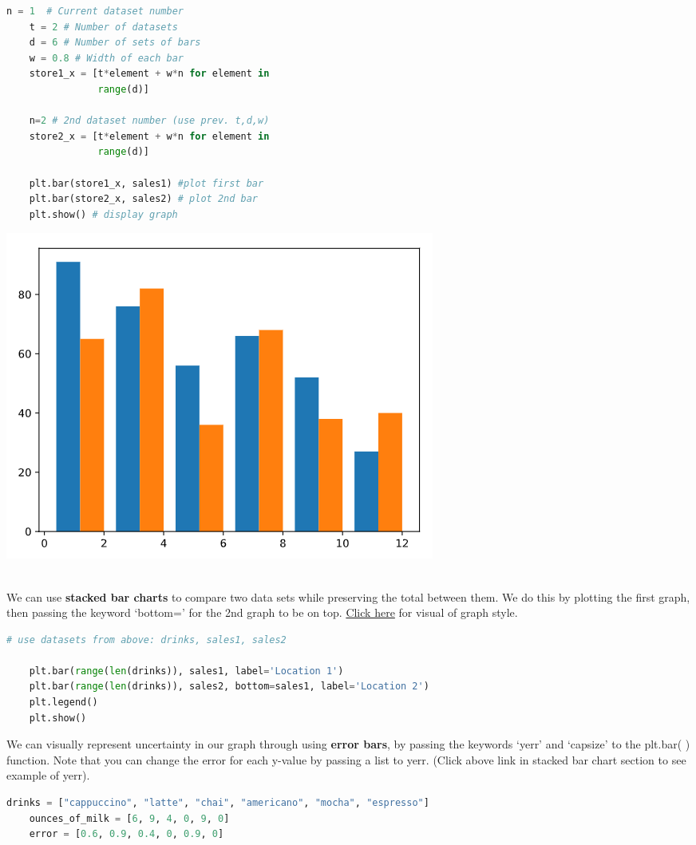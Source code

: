 \documentclass[11pt, a4paper]{article}
\begin{document}
\begin{spacing}{1.1}
\begin{minipage}[c]{9.2cm}
\begin{lstlisting}[language=Python]
	n = 1  # Current dataset number
	t = 2 # Number of datasets
	d = 6 # Number of sets of bars
	w = 0.8 # Width of each bar
	store1_x = [t*element + w*n for element in 
	            range(d)]
		
	n=2 # 2nd dataset number (use prev. t,d,w)
	store2_x = [t*element + w*n for element in 
	            range(d)]
	
	plt.bar(store1_x, sales1) #plot first bar
	plt.bar(store2_x, sales2) # plot 2nd bar
	plt.show() # display graph \end{lstlisting}\vspace*{1mm}
	\end{minipage}
	\begin{minipage}[c]{8cm}
		\includegraphics[scale=.57]{sidebyside}
	\end{minipage} \vspace*{1mm} \\
	We can use \textbf{stacked bar charts} to compare two data sets while preserving the total between them. We do this by plotting the first graph, then passing the keyword `bottom=' for the 2nd graph to be on top. \href{https://matplotlib.org/3.1.1/gallery/lines_bars_and_markers/bar_stacked.html}{Click here} for visual of graph style.
	\begin{lstlisting}[language=Python]
	# use datasets from above: drinks, sales1, sales2 
	
	plt.bar(range(len(drinks)), sales1, label='Location 1')
	plt.bar(range(len(drinks)), sales2, bottom=sales1, label='Location 2')
	plt.legend()
	plt.show() \end{lstlisting}\vspace*{1mm}
	We can visually represent uncertainty in our graph through using \textbf{error bars}, by passing the keywords `yerr' and `capsize' to the plt.bar( ) function. Note that you can change the error for each y-value by passing a list to yerr. (Click above link in stacked bar chart section to see example of yerr).
	\begin{lstlisting}[language=Python]
	drinks = ["cappuccino", "latte", "chai", "americano", "mocha", "espresso"]
	ounces_of_milk = [6, 9, 4, 0, 9, 0]
	error = [0.6, 0.9, 0.4, 0, 0.9, 0]
	

\end{lstlisting}
\end{spacing}
\end{document}
